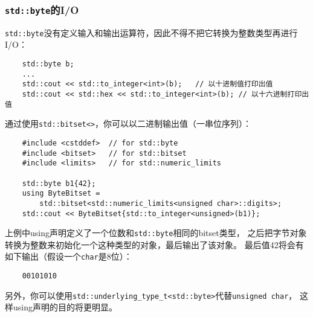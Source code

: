 \subsubsection*{\texttt{std::byte}的I/O}\label{ch18.2.2.2}
\texttt{std::byte}没有定义输入和输出运算符，因此不得不把它转换为整数类型再进行I/O：
\begin{lstlisting}
    std::byte b;
    ...
    std::cout << std::to_integer<int>(b);   // 以十进制值打印出值
    std::cout << std::hex << std::to_integer<int>(b); // 以十六进制打印出值
\end{lstlisting}
通过使用\texttt{std::bitset<>}，你可以以二进制输出值（一串位序列）：
\begin{lstlisting}
    #include <cstddef>  // for std::byte
    #include <bitset>   // for std::bitset
    #include <limits>   // for std::numeric_limits

    std::byte b1{42};
    using ByteBitset =
        std::bitset<std::numeric_limits<unsigned char>::digits>;
    std::cout << ByteBitset{std::to_integer<unsigned>(b1)};
\end{lstlisting}
上例中using声明定义了一个位数和\texttt{std::byte}相同的bitset类型，
之后把字节对象转换为整数来初始化一个这种类型的对象，最后输出了该对象。
最后值42将会有如下输出（假设一个\texttt{char}是8位）：
\begin{lstlisting}
    00101010
\end{lstlisting}
另外，你可以使用\texttt{std::underlying\_type\_t<std::byte>}代替\texttt{unsigned char}，
这样using声明的目的将更明显。

